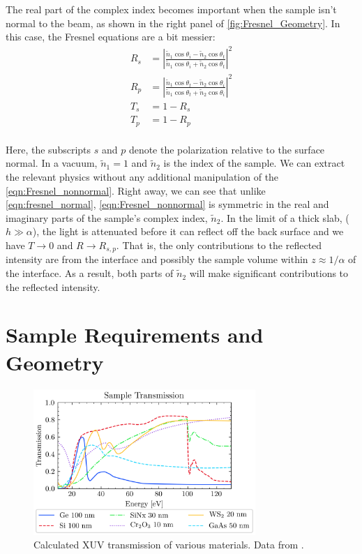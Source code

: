 The real part of the complex index becomes important when the sample isn't normal to the beam, as shown in the right panel of \cref{fig:Fresnel_Geometry}. In this case, the Fresnel equations are a bit messier:
\begin{equation}
\begin{aligned}
R_s &= \left| \frac{\tilde{n}_1 \cos \theta_i - \tilde{n}_2 \cos \theta_t}{\tilde{n}_1 \cos \theta_i + \tilde{n}_2 \cos \theta_t}  \right|^2 \\
R_p &= \left| \frac{\tilde{n}_1 \cos \theta_t - \tilde{n}_2 \cos \theta_i}{\tilde{n}_1 \cos \theta_t + \tilde{n}_2 \cos \theta_i}  \right|^2 \\
T_s &= 1 - R_s \\
T_p &= 1 - R_p \\
\end{aligned}
\label{eqn:Fresnel_nonnormal}
\end{equation}

Here, the subscripts $s$ and $p$ denote the polarization relative to the surface normal. In a vacuum, $\tilde{n}_1=1$ and $\tilde{n}_2$ is the index of the sample. We can extract the relevant physics without any additional manipulation of the \cref{eqn:Fresnel_nonnormal}. Right away, we can see that unlike \cref{eqn:fresnel_normal}, \cref{eqn:Fresnel_nonnormal} is symmetric in the real and imaginary parts of the sample's complex index, $\tilde{n}_2$. In the limit of a thick slab, ($h \gg \alpha$), the light is attenuated before it can reflect off the back surface and we have $T \rightarrow 0$ and $R \rightarrow R_{s,p}$. That is, the only contributions to the reflected intensity are from the interface and possibly the sample volume within $z \approx 1/\alpha$ of the interface. As a result, both parts of $\tilde{n}_2$ will make significant contributions to the reflected intensity.

\section{Sample Requirements and Geometry}

\begin{figure}
	\centering
	\includegraphics[width=0.75\textwidth]{figures/chap3/Sample_trans_CXRO.png}
	\caption{Calculated XUV transmission of various materials. Data from \cite{gulliksonCXROXRayInteractions}.}
	\label{fig:Sample_trans_CXRO}
\end{figure}

